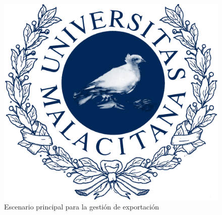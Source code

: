 \begin{figure}[H]
    \includegraphics[width=1\linewidth]{assets/umaLogo.png}
    \caption{Escenario principal para la gestión de exportación}
\end{figure}
